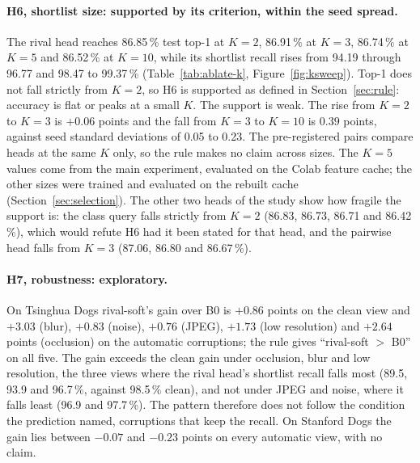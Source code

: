 \documentclass[11pt,a4paper]{article}
\theoremstyle{plain}
\begin{document}
\paragraph{H6, shortlist size: supported by its criterion, within the seed spread.}
The rival head reaches 86.85\,\% test top-1 at $K=2$, 86.91\,\% at $K=3$, 86.74\,\% at $K=5$ and 86.52\,\% at
$K=10$, while its shortlist recall rises from 94.19 through 96.77 and 98.47 to 99.37\,\% (Table~\ref{tab:ablate-k},
Figure~\ref{fig:ksweep}). Top-1 does not fall strictly from $K=2$, so H6 is supported as defined in
Section~\ref{sec:rule}: accuracy is flat or peaks at a small $K$. The support is weak. The rise from $K=2$ to $K=3$
is $+0.06$ points and the fall from $K=3$ to $K=10$ is $0.39$ points, against seed standard deviations of 0.05 to
0.23. The pre-registered pairs compare heads at the same $K$ only, so the rule makes no claim across sizes. The $K=5$
values come from the main experiment, evaluated on the Colab feature cache; the other sizes were trained and evaluated
on the rebuilt cache (Section~\ref{sec:selection}). The other two heads of the study show how fragile the support
is: the class query falls strictly from $K=2$ (86.83, 86.73, 86.71 and 86.42\,\%), which would refute H6 had it been
stated for that head, and the pairwise head falls from $K=3$ (87.06, 86.80 and 86.67\,\%).

\paragraph{H7, robustness: exploratory.}
On Tsinghua Dogs rival-soft's gain over B0 is $+0.86$ points on the clean view and $+3.03$ (blur), $+0.83$ (noise),
$+0.76$ (JPEG), $+1.73$ (low resolution) and $+2.64$ points (occlusion) on the automatic corruptions; the rule gives
``rival-soft $>$ B0'' on all five. The gain exceeds the clean gain under occlusion, blur and low resolution, the
three views where the rival head's shortlist recall falls most (89.5, 93.9 and 96.7\,\%, against 98.5\,\% clean),
and not under JPEG and noise, where it falls least (96.9 and 97.7\,\%). The pattern therefore does not follow the
condition the prediction named, corruptions that keep the recall. On Stanford Dogs the gain lies between $-0.07$ and
$-0.23$ points on every automatic view, with no claim.
\end{document}
